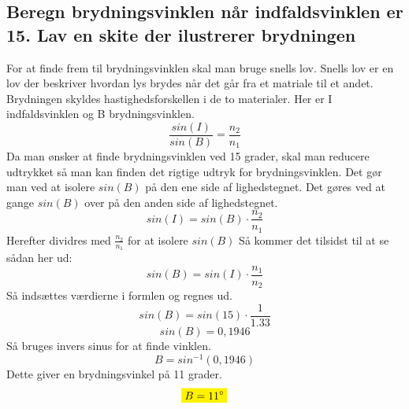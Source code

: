 \subsection{Beregn brydningsvinklen når indfaldsvinklen er 15. Lav en skite der ilustrerer brydningen}
For at finde frem til brydningsvinklen skal man bruge snells lov. Snells lov er en lov der beskriver hvordan lys brydes når det går fra et matriale til et andet. Brydningen skyldes hastighedsforskellen i de to materialer. Her er I indfaldsvinklen og B brydningsvinklen. 
\begin{equation*}
    \frac{sin(I)}{sin(B)}=\frac{n_2}{n_1}
\end{equation*}
Da man ønsker at finde brydningsvinklen ved 15 grader, skal man reducere udtrykket så man kan finden det rigtige udtryk for brydningsvinklen. Det gør man ved at isolere \begin{math}sin(B)\end{math} på den ene side af lighedstegnet. Det gøres ved at gange \begin{math}sin(B)\end{math} over på den anden side af lighedstegnet. 
\begin{equation*}
    sin(I)=sin(B) \cdot \frac{n_2}{n_1}
\end{equation*}
Herefter dividres med \begin{math}\frac{n_2}{n_1}\end{math} for at isolere \begin{math}sin(B)\end{math}
Så kommer det tilsidst til at se sådan her ud:
\begin{equation*}
    sin(B)=sin(I)\cdot\frac{n_1}{n_2}
\end{equation*}
Så indsættes værdierne i formlen og regnes ud. 
\begin{equation*}
    sin(B)=sin(15)\cdot\frac{1}{1.33}
\end{equation*}
\begin{equation*}
    sin(B)=0,1946
\end{equation*}
Så bruges invers sinus for at finde vinklen.
\begin{equation*}
    B=sin^{-1}(0,1946)
\end{equation*}
Dette giver en brydningsvinkel på 11 grader.
\begin{equation*}
    \mathcolorbox{yellow}{B=11^{\circ}}
\end{equation*}
